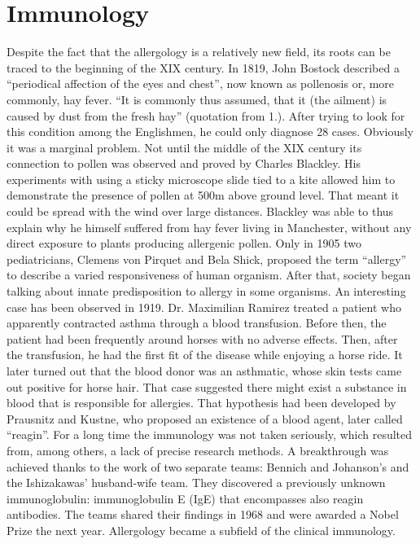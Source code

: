 \documentclass[10pt,oneside]{memoir}
\begin{document}
\part{Immunology}
\label{chapter2}

Despite the fact that the allergology is a relatively new field, its roots can be traced to the beginning of the XIX century. In 1819, John Bostock described a ``periodical affection of the eyes and chest'', now known as pollenosis or, more commonly, hay fever. ``It is commonly thus assumed, that it (the ailment) is caused by dust from the fresh hay'' (quotation from 1.). After trying to look for this condition among the Englishmen, he could only diagnose 28 cases. Obviously it was a marginal problem. Not until the middle of the XIX century its connection to pollen was observed and proved by Charles Blackley. His experiments with using a sticky microscope slide tied to a kite allowed him to demonstrate the presence of pollen at 500m above ground level. That meant it could be spread with the wind over large distances. Blackley was able to thus explain why he himself suffered from hay fever living in Manchester, without any direct exposure to plants producing allergenic pollen. Only in 1905 two pediatricians, Clemens von Pirquet and Bela Shick, proposed the term ``allergy'' to describe a varied responsiveness of human organism. After that, society began talking about innate predisposition to allergy in some organisms.
An interesting case has been observed in 1919. Dr. Maximilian Ramirez treated a patient who apparently contracted asthma through a blood transfusion. Before then, the patient had been frequently around horses with no adverse effects. Then, after the transfusion, he had the first fit of the disease while enjoying a horse ride. It later turned out that the blood donor was an asthmatic, whose skin tests came out positive for horse hair. That case suggested there might exist a substance in blood that is responsible for allergies. That hypothesis had been developed by Prausnitz and Kustne, who proposed an existence of a blood agent, later called ``reagin''.
For a long time the immunology was not taken seriously, which resulted from, among others, a lack of precise research methods. A breakthrough was achieved thanks to the work of two separate teams: Bennich and Johanson's and the Ishizakawas' husband-wife team. They discovered a previously unknown immunoglobulin: immunoglobulin E (IgE) that encompasses also reagin antibodies. The teams shared their findings in 1968 and were awarded a Nobel Prize the next year. Allergology became a subfield of the clinical immunology.
\end{document}
